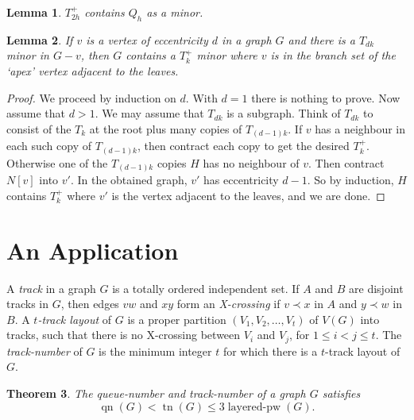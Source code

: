 \documentclass[a4paper,11pt]{article}
\DeclareMathOperator{\tn}{tn}
\DeclareMathOperator{\qn}{qn}
\DeclareMathOperator{\pb}{layered-pw}
\theoremstyle{plain}
\newtheorem{theorem}{Theorem}
\newtheorem{lemma}[theorem]{Lemma}
\theoremstyle{definition}
\begin{document}
\begin{lemma} 
\label{FindQh}
$T_{2h}^+$ contains $Q_h$ as a minor.
\end{lemma}

\begin{lemma} 
\label{FindTk+}
If $v$ is a vertex of eccentricity $d$ in a graph $G$ and there is a 
$T_{dk}$ minor in $G-v$, then $G$ contains a $T_k^+$ minor where $v$ is in the
branch set of the `apex' vertex adjacent to the leaves.
\end{lemma}

\begin{proof}
We proceed by induction on $d$. With $d=1$ there is nothing to
prove. Now assume that $d > 1$. We may assume that $T_{dk}$ is a subgraph.
Think of $T_{dk}$ to consist of the $T_k$ at the root plus many copies of
$T_{(d-1)k}$. If $v$ has a neighbour in each such copy of $T_{(d-1)k}$, then
contract each copy to get the desired $T_k^+$. Otherwise one of the
$T_{(d-1)k}$ copies $H$ has no neighbour of $v$. Then contract $N[v]$ into $v'$.
In the obtained graph, $v'$ has eccentricity $d-1$. So by induction, $H$
contains $T_k^+$ where $v'$ is the vertex adjacent to the leaves, and we
are done.
\end{proof}

\section{An Application}

A \emph{track} in a graph $G$ is a totally ordered independent set. If $A$ and $B$ are disjoint tracks in $G$, then edges $vw$ and $xy$ form an \emph{X-crossing} if $v\prec x$ in $A$ and $y\prec w$ in $B$. A \emph{$t$-track layout} of $G$ is a proper partition $(V_1,V_2,\dots,V_t)$ of $V(G)$ into tracks, such that there is no X-crossing between $V_i$ and $V_j$, for $1\leq i<j\leq t$. The \emph{track-number} of  $G$ is the minimum integer $t$ for which there is a $t$-track layout of $G$. 

\begin{theorem}
\label{qntnpb}
The queue-number and track-number of a graph $G$ satisfies
$$\qn(G)<\tn(G)\leq 3\pb(G).$$ 
\end{theorem}
\end{document}
